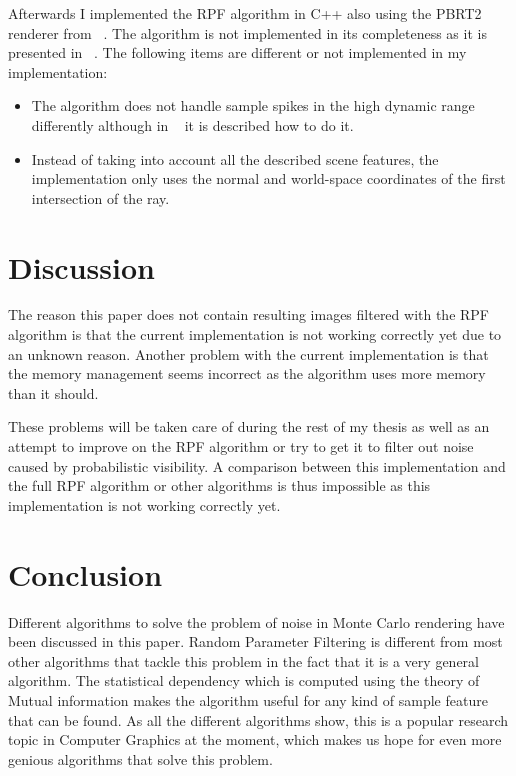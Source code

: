 \documentclass[review]{acmsiggraph}
\begin{document}
Afterwards I implemented the RPF algorithm in C++ also using the PBRT2 renderer from ~\cite{pharr2010physically}.
The algorithm is not implemented in its completeness as it is presented in ~\cite{RPFTechReport}.
The following items are different or not implemented in my implementation:

\begin{itemize}
 \item The algorithm does not handle sample spikes in the high dynamic range differently although in ~\cite{RPFTechReport} it is described how to do it.
 \item Instead of taking into account all the described scene features, the implementation only uses the normal and world-space coordinates of the first intersection of the ray.
\end{itemize}

\section{Discussion}
The reason this paper does not contain resulting images filtered with the RPF algorithm is that the current implementation is not working correctly yet due to an unknown reason.
Another problem with the current implementation is that the memory management seems incorrect as the algorithm uses more memory than it should.

These problems will be taken care of during the rest of my thesis as well as an attempt to improve on the RPF algorithm or try to get it to filter out noise caused by probabilistic visibility.
A comparison between this implementation and the full RPF algorithm or other algorithms is thus impossible as this implementation is not working correctly yet.

\section{Conclusion}
Different algorithms to solve the problem of noise in Monte Carlo rendering have been discussed in this paper.
Random Parameter Filtering is different from most other algorithms that tackle this problem in the fact that it is a very general algorithm.
The statistical dependency which is computed using the theory of Mutual information makes the algorithm useful for any kind of sample feature that can be found.
As all the different algorithms show, this is a popular research topic in Computer Graphics at the moment, which makes us hope for even more genious algorithms that solve this problem.





\end{document}
